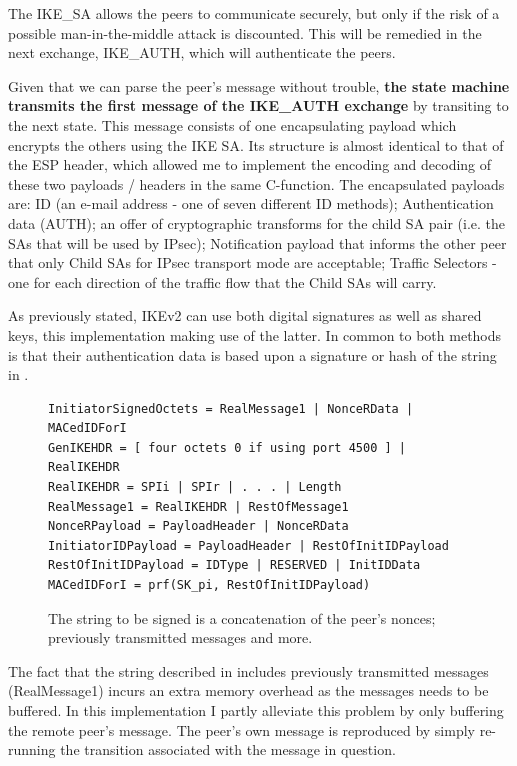 \documentclass[final,a4paper,twoside,11pt,onecolumn]{report}
\begin{document}
The IKE\_SA allows the peers to communicate securely, but only if the risk of a possible man-in-the-middle attack is discounted. This will be remedied in the next exchange, IKE\_AUTH, which will authenticate the peers.

Given that we can parse the peer's message without trouble, \textbf{the state machine transmits the first message of the IKE\_AUTH exchange} by transiting to the next state. This message consists of one encapsulating payload which encrypts the others using the IKE SA. Its structure is almost identical to that of the ESP header, which allowed me to implement the encoding and decoding of these two payloads / headers in the same C-function. The encapsulated payloads are: ID (an e-mail address - one of seven different ID methods); Authentication data (AUTH); an offer of cryptographic transforms for the child SA pair (i.e. the SAs that will be used by IPsec); Notification payload that informs the other peer that only Child SAs for IPsec transport mode are acceptable; Traffic Selectors - one for each direction of the traffic flow that the Child SAs will carry.

As previously stated, IKEv2 can use both digital signatures as well as shared keys, this implementation making use of the latter. In common to both methods is that their authentication data is based upon a signature or hash of the string in .

\begin{figure}[h]
\begin{verbatim}
InitiatorSignedOctets = RealMessage1 | NonceRData | MACedIDForI
GenIKEHDR = [ four octets 0 if using port 4500 ] | RealIKEHDR 
RealIKEHDR = SPIi | SPIr | . . . | Length 
RealMessage1 = RealIKEHDR | RestOfMessage1
NonceRPayload = PayloadHeader | NonceRData
InitiatorIDPayload = PayloadHeader | RestOfInitIDPayload 
RestOfInitIDPayload = IDType | RESERVED | InitIDData 
MACedIDForI = prf(SK_pi, RestOfInitIDPayload)
\end{verbatim}
\label{fig:sign-string}
\caption{The string to be signed is a concatenation of the peer's nonces; previously transmitted messages and more.}
\end{figure}

The fact that the string described in  includes previously transmitted messages (RealMessage1) incurs an extra memory overhead as the messages needs to be buffered. In this implementation I partly alleviate this problem by only buffering the remote peer's message. The peer's own message is reproduced by simply re-running the transition associated with the message in question.
\end{document}
